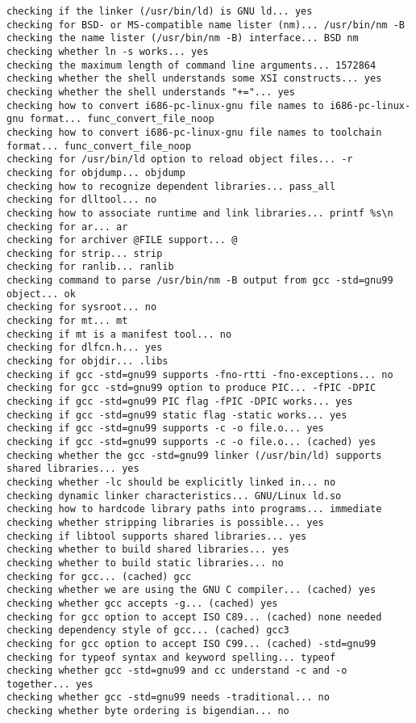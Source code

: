 \documentclass[11pt,a4paper]{article}
\begin{document}
{\begin{shaded}
\begin{verbatim}
checking if the linker (/usr/bin/ld) is GNU ld... yes
checking for BSD- or MS-compatible name lister (nm)... /usr/bin/nm -B
checking the name lister (/usr/bin/nm -B) interface... BSD nm
checking whether ln -s works... yes
checking the maximum length of command line arguments... 1572864
checking whether the shell understands some XSI constructs... yes
checking whether the shell understands "+="... yes
checking how to convert i686-pc-linux-gnu file names to i686-pc-linux-gnu format... func_convert_file_noop
checking how to convert i686-pc-linux-gnu file names to toolchain format... func_convert_file_noop
checking for /usr/bin/ld option to reload object files... -r
checking for objdump... objdump
checking how to recognize dependent libraries... pass_all
checking for dlltool... no
checking how to associate runtime and link libraries... printf %s\n
checking for ar... ar
checking for archiver @FILE support... @
checking for strip... strip
checking for ranlib... ranlib
checking command to parse /usr/bin/nm -B output from gcc -std=gnu99 object... ok
checking for sysroot... no
checking for mt... mt
checking if mt is a manifest tool... no
checking for dlfcn.h... yes
checking for objdir... .libs
checking if gcc -std=gnu99 supports -fno-rtti -fno-exceptions... no
checking for gcc -std=gnu99 option to produce PIC... -fPIC -DPIC
checking if gcc -std=gnu99 PIC flag -fPIC -DPIC works... yes
checking if gcc -std=gnu99 static flag -static works... yes
checking if gcc -std=gnu99 supports -c -o file.o... yes
checking if gcc -std=gnu99 supports -c -o file.o... (cached) yes
checking whether the gcc -std=gnu99 linker (/usr/bin/ld) supports shared libraries... yes
checking whether -lc should be explicitly linked in... no
checking dynamic linker characteristics... GNU/Linux ld.so
checking how to hardcode library paths into programs... immediate
checking whether stripping libraries is possible... yes
checking if libtool supports shared libraries... yes
checking whether to build shared libraries... yes
checking whether to build static libraries... no
checking for gcc... (cached) gcc
checking whether we are using the GNU C compiler... (cached) yes
checking whether gcc accepts -g... (cached) yes
checking for gcc option to accept ISO C89... (cached) none needed
checking dependency style of gcc... (cached) gcc3
checking for gcc option to accept ISO C99... (cached) -std=gnu99
checking for typeof syntax and keyword spelling... typeof
checking whether gcc -std=gnu99 and cc understand -c and -o together... yes
checking whether gcc -std=gnu99 needs -traditional... no
checking whether byte ordering is bigendian... no

\end{verbatim}
\end{shaded}}
\end{document}
